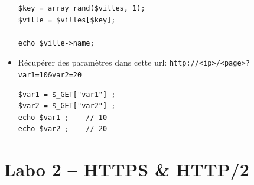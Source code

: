 \documentclass[a4paper]{article}
\begin{document}
\begin{itemize}
\begin{lstlisting}[style=php]
$key = array_rand($villes, 1);
$ville = $villes[$key];

echo $ville->name;
\end{lstlisting}


\item Récupérer des paramètres dans cette url: \texttt{http://<ip>/<page>?var1=10\&var2=20}
\begin{lstlisting}[style=php]
$var1 = $_GET["var1"] ;
$var2 = $_GET["var2"] ;
echo $var1 ;    // 10
echo $var2 ;    // 20
\end{lstlisting}


\end{itemize}















\section{Labo 2 -- HTTPS \& HTTP/2}
\end{document}

